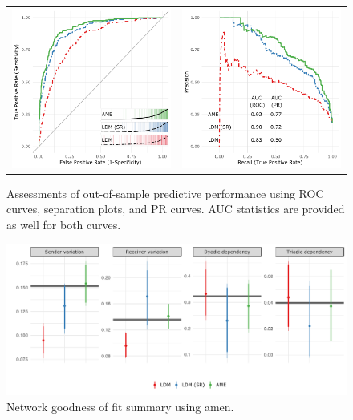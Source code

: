 \documentclass[12pt,pdflatex]{elsarticle}
\newcommand{\pkg}[1]{{\fontseries{b}\selectfont #1}}
\begin{document}
\begin{figure}[ht]
	\centering
	\begin{tabular}{cc}
	\includegraphics[width=.5\textwidth]{roc_latSpace_outSampleSmall} &
	\includegraphics[width=.5\textwidth]{rocPr_latSpace_outSampleSmall}
	\end{tabular}
	\caption{Assessments of out-of-sample predictive performance using ROC curves, separation plots, and PR curves. AUC statistics are provided as well for both curves.}
	\label{fig:roc_latentSpace}
\end{figure}

\begin{figure}[ht]
	\centering
	\includegraphics[width=1\textwidth]{netPerfCoef_latSpaceSmall}
	\caption{Network goodness of fit summary using \pkg{amen}.}
	\label{fig:netPerfCoef_latSpace}
\end{figure}
\end{document}
